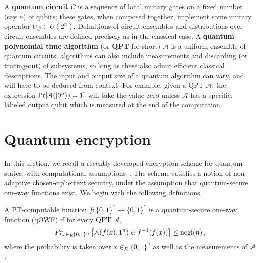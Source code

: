 \documentclass[envcountsame]{llncs}
\numberwithin{equation}{section}
\newcommand{\opn}{\operatorname}
\newcommand{\expref}[2]{\texorpdfstring{\hyperref[#2]{#1~\ref{#2}}}{#1~\ref{#2}}}
\newcommand{\algo}{\mathcal}
\newcommand{\negl}{\opn{negl}}
\newcommand{\inrand}{\in_R}
\begin{document}
A \textbf{quantum circuit} $C$ is a sequence of local unitary gates on a fixed number (say $n$) of qubits; these gates, when composed together, implement some unitary operator $U_C \in U(2^n)$. Definitions of circuit ensembles and distributions over circuit ensembles are defined precisely as in the classical case. A \textbf{quantum polynomial time algorithm} (or \textbf{QPT} for short) $\mathcal A$ is a uniform ensemble of quantum circuits; algorithms can also include measurements and discarding (or tracing-out) of subsystems, so long as these also admit efficient classical descriptions. The input and output size of a quantum algorithm can vary, and will have to be deduced from context. For example, given a QPT $\mathcal A$, the expression $\Pr[\mathcal A({\left\vert{0^n}\right\rangle}) = 1]$ will take the value zero unless $\mathcal A$ has a specific, labeled output qubit which is measured at the end of the computation.

\section{Quantum encryption}\label{sec:encryption}

In this section, we recall a recently developed encryption scheme for quantum states, with computational assumptions~\cite{ABFGSS16}. The scheme satisfies a notion of non-adaptive chosen-ciphertext security, under the assumption that quantum-secure one-way functions exist. We begin with the following definitions.


\begin{definition}\label{def:quantum-secure-owf}
A PT-computable function $f:\{0,1\}^* \rightarrow \{0, 1\}^*$ is a quantum-secure one-way function (qOWF) if for every QPT $\algo A$, 
$$
\emph{Pr}_{x \inrand \{0, 1\}^n} \left[\algo A (f(x), 1^n) \in f^{-1}(f(x)) \right] \leq \negl(n)\,,
$$
where the probability is taken over $x \inrand \{0, 1\}^n$ as well as the measurements of $\algo A$.
\end{definition}
\end{document}
